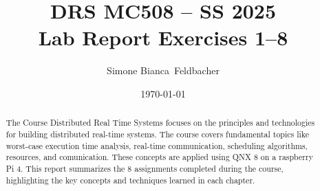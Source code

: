 \documentclass[english,notitlepage,smartquotes]{hgbreport}
\begin{document}

\author{Simone Bianca\ Feldbacher}                      %
\title{DRS MC508 -- SS 2025\\ %
				Lab Report Exercises 1--8} %
\date{\today}

\maketitle

\begin{abstract}\noindent
The Course Distributed Real Time Systems focuses on the principles and
technologies for building distributed real-time systems. The course covers fundamental topics like worst-case execution time analysis, real-time communication, scheduling algorithms, resources, and comunication. These concepts are applied using QNX 8 on a raspberry Pi 4. 
This report summarizes the 8 assignments completed during the course, highlighting the key concepts and techniques learned in each chapter. 

\end{abstract}


\tableofcontents
\cleardoublepage










\printbibliography[heading=noheader]

\end{document}
